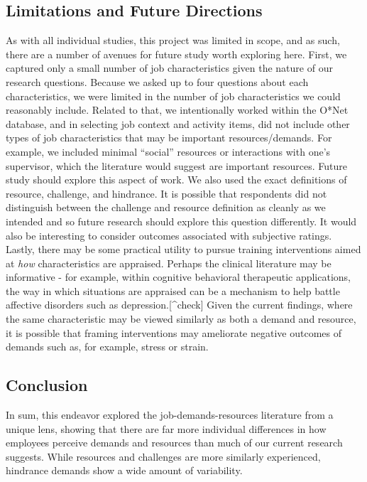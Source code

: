 \documentclass[
  english,
  man]{apa6}
\begin{document}
\hypertarget{limitations-and-future-directions}{%
\subsection{Limitations and Future Directions}\label{limitations-and-future-directions}}

As with all individual studies, this project was limited in scope, and as such, there are a number of avenues for future study worth exploring here. First, we captured only a small number of job characteristics given the nature of our research questions. Because we asked up to four questions about each characteristics, we were limited in the number of job characteristics we could reasonably include. Related to that, we intentionally worked within the O*Net database, and in selecting job context and activity items, did not include other types of job characteristics that may be important resources/demands. For example, we included minimal ``social'' resources or interactions with one's supervisor, which the literature would suggest are important resources. Future study should explore this aspect of work. We also used the exact definitions of resource, challenge, and hindrance. It is possible that respondents did not distinguish between the challenge and resource definition as cleanly as we intended and so future research should explore this question differently. It would also be interesting to consider outcomes associated with subjective ratings.
Lastly, there may be some practical utility to pursue training interventions aimed at \emph{how} characteristics are appraised. Perhaps the clinical literature may be informative - for example, within cognitive behavioral therapeutic applications, the way in which situations are appraised can be a mechanism to help battle affective disorders such as depression.{[}\^{}check{]} Given the current findings, where the same characteristic may be viewed similarly as both a demand and resource, it is possible that framing interventions may ameliorate negative outcomes of demands such as, for example, stress or strain.

\hypertarget{conclusion}{%
\subsection{Conclusion}\label{conclusion}}

In sum, this endeavor explored the job-demands-resources literature from a unique lens, showing that there are far more individual differences in how employees perceive demands and resources than much of our current research suggests. While resources and challenges are more similarly experienced, hindrance demands show a wide amount of variability.
\end{document}
